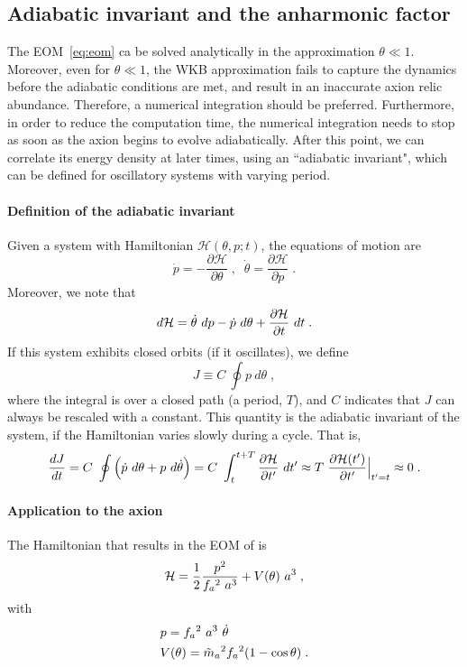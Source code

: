 \documentclass[11pt,a4paper]{article}
\begin{document}
\subsection{Adiabatic invariant and the anharmonic factor}\label{sec:an_fac}
%
The EOM~\ref{eq:eom} ca be solved analytically in the approximation $\theta \ll 1$. Moreover, even for $\theta\ll 1$, the WKB approximation fails to capture the dynamics before the adiabatic conditions are met, and result in an inaccurate axion relic abundance.  Therefore, a numerical integration should be preferred. Furthermore, in order to reduce the computation time, the numerical integration needs to stop as soon as the axion begins to evolve adiabatically. After this point, we can correlate its energy density at later times, using an ``adiabatic invariant", which can be defined  for oscillatory systems with varying period.

\paragraph{Definition of the adiabatic invariant}
%
Given a system with Hamiltonian $\mathcal{H}(\theta,p;t)$, the equations of motion are 
%
\begin{equation}
	\dot p = - \dfrac{\partial \mathcal{H}}{\partial \theta} \;, \;\; 
	\dot \theta =  \dfrac{\partial \mathcal{H}}{\partial p} \;.
	\label{eq:hamiltonian_eoms}
\end{equation}
%
Moreover, we note that
%
\begin{equation}
	d \mathcal{H} = \dot \theta \ d p - \dot p \ d \theta + \dfrac{\partial \mathcal{H}}{\partial t} \ d t \;.  
	\label{eq:total_dH}
\end{equation}
%
If this system exhibits closed orbits (\eg if it oscillates), we define 
%
\begin{equation}
	J \equiv C \ \oint p \ d \theta \;,
	\label{eq:adiabatic_inv_def}
\end{equation}
%
where the integral is over a closed path (\eg a period, $T$), and $C$ indicates that $J$ can always be rescaled with a constant. This quantity is the adiabatic invariant of the system, if the Hamiltonian varies slowly during a cycle. That is,
%
\[
\dfrac{d J}{d t} = C \ \oint \lrBigb{\dot p \ d \theta + p \ d \dot \theta} = C \ \dint_{t}^{t+T}  \dfrac{\partial \Ham}{\partial t^\prime} \ d t^\prime \approx T \ \dfrac{\partial \Ham(t^{\prime})}{\partial t^{\prime}}\Big|_{t^{\prime}=t} \approx 0 
\;. 
\]
%




\paragraph{Application to the axion}
%
The Hamiltonian that results in the EOM of  is
%
\begin{equation}
	\mathcal{H} = \dfrac{1}{2} \dfrac{p^2}{f_{a}{}^2 \ a^3} + V(\theta) \ a^3\;,
	\label{eq:axion_H}
\end{equation}
%
with 
%
\begin{eqnarray}
	& p = f_{a}{}^2 \ a^3 \ \dot \theta \\
	\label{eq:momentum}
	& V(\theta) = \tilde m_{a}{}^2 f_{a}{}^2 (1-\cos \theta) \;.
	\label{eq:potential}
\end{eqnarray}
\end{document}
